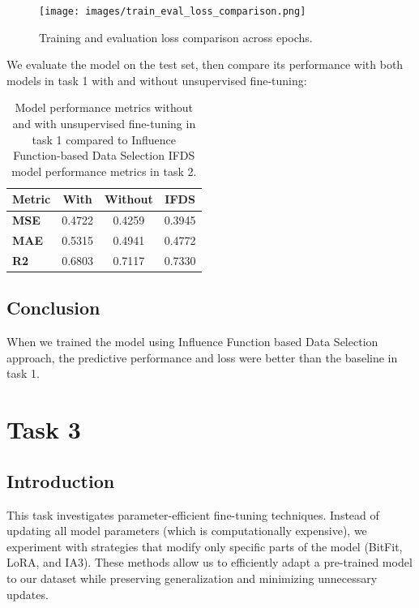 \documentclass[11pt]{article}
\begin{document}
\begin{figure}[ht]
  \centering
  \texttt{[image: images/train\_eval\_loss\_comparison.png]}
  \caption{Training and evaluation loss comparison across epochs.}
  \label{fig:results}
\end{figure}
We evaluate the model on the test set, then compare its performance with both models in task 1 with and without unsupervised fine-tuning:
\begin{table}[ht]
\centering
\begin{tabular}{lccc}
\hline
\textbf{Metric} & \textbf{With} & \textbf{Without} & \textbf{IFDS} \\
\hline
\textbf{MSE} & 0.4722 & 0.4259 & 0.3945 \\
\textbf{MAE} & 0.5315 & 0.4941 & 0.4772 \\
\textbf{R2}  & 0.6803 & 0.7117 & 0.7330 \\
\hline
\end{tabular}
\caption{Model performance metrics without and with unsupervised fine-tuning in task 1 compared to Influence Function-based Data Selection IFDS model performance metrics in task 2.}
\label{tab:metrics_comparison}
\end{table}


\subsection{Conclusion}
When we trained the model using Influence Function based Data Selection approach, the predictive performance and loss were better than the baseline in task 1.

\section{Task 3} 
\subsection{Introduction}
This task investigates parameter-efficient fine-tuning techniques. Instead of updating all model parameters (which is computationally expensive), we experiment with strategies that modify only specific parts of the model (BitFit, LoRA, and IA3). These methods allow us to efficiently adapt a pre-trained model to our dataset while preserving generalization and minimizing unnecessary updates.
\end{document}
